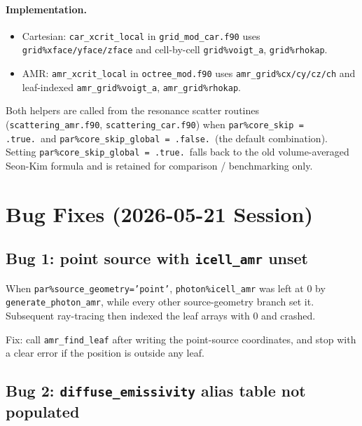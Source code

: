 \documentclass[english,a4paper]{my_memo}
\begin{document}
\paragraph{Implementation.}
\begin{itemize}
\item Cartesian: \texttt{car\_xcrit\_local} in \texttt{grid\_mod\_car.f90}
      uses \texttt{grid\%xface/yface/zface} and cell-by-cell
      \texttt{grid\%voigt\_a}, \texttt{grid\%rhokap}.
\item AMR: \texttt{amr\_xcrit\_local} in \texttt{octree\_mod.f90} uses
      \texttt{amr\_grid\%cx/cy/cz/ch} and leaf-indexed
      \texttt{amr\_grid\%voigt\_a}, \texttt{amr\_grid\%rhokap}.
\end{itemize}
Both helpers are called from the resonance scatter routines
(\texttt{scattering\_amr.f90}, \texttt{scattering\_car.f90}) when
\texttt{par\%core\_skip = .true.}\ and \texttt{par\%core\_skip\_global =
.false.}\ (the default combination).  Setting
\texttt{par\%core\_skip\_global = .true.}\ falls back to the old
volume-averaged Seon-Kim formula and is retained for comparison /
benchmarking only.

\section{Bug Fixes (2026-05-21 Session)}

\subsection{Bug 1: point source with \texttt{icell\_amr} unset}

When \texttt{par\%source\_geometry='point'},
\texttt{photon\%icell\_amr} was left at 0 by
\texttt{generate\_photon\_amr}, while every other source-geometry branch
set it.  Subsequent ray-tracing then indexed the leaf arrays with 0 and
crashed.

Fix: call \texttt{amr\_find\_leaf} after writing the point-source
coordinates, and stop with a clear error if the position is outside any
leaf.

\subsection{Bug 2: \texttt{diffuse\_emissivity} alias table not populated}
\end{document}
